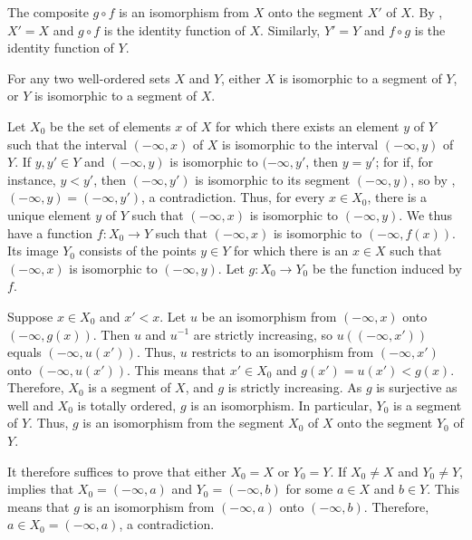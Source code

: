\documentclass{article}
\begin{document}
The composite \(g \circ f\) is an isomorphism from \(X\) onto the
segment \(X'\) of \(X\).  By , \(X' = X\) and
\(g \circ f\) is the identity function of \(X\).  Similarly,
\(Y' = Y\) and \(f \circ g\) is the identity function of \(Y\).

\begin{theorem}
  \label{thm:vy95iuyi}
  For any two well-ordered sets \(X\) and \(Y\), either \(X\) is
  isomorphic to a segment of \(Y\), or \(Y\) is isomorphic to a
  segment of \(X\).
\end{theorem}

Let \(X_0\) be the set of elements \(x\) of \(X\) for which there
exists an element \(y\) of \(Y\) such that the interval
\((-\infty, x)\) of \(X\) is isomorphic to the interval
\((-\infty, y)\) of \(Y\).  If \(y, y' \in Y\) and \((-\infty, y)\) is
isomorphic to \((-\infty, y'\), then \(y = y'\); for if, for instance,
\(y < y'\), then \((-\infty, y')\) is isomorphic to its segment
\((-\infty, y)\), so by ,
\((-\infty, y) = (-\infty, y')\), a contradiction.  Thus, for every
\(x \in X_0\), there is a unique element \(y\) of \(Y\) such that
\((-\infty, x)\) is isomorphic to \((-\infty, y)\).  We thus have a
function \(f : X_0 \to Y\) such that \((-\infty, x)\) is isomorphic to
\((-\infty, f(x))\).  Its image \(Y_0\) consists of the points
\(y \in Y\) for which there is an \(x \in X\) such that
\((-\infty, x)\) is isomorphic to \((-\infty, y)\).  Let
\(g : X_0 \to Y_0\) be the function induced by \(f\).

Suppose \(x \in X_0\) and \(x' < x\).  Let \(u\) be an isomorphism
from \((-\infty, x)\) onto \((-\infty, g(x))\).  Then \(u\) and
\(u^{-1}\) are strictly increasing, so \(u((-\infty, x'))\) equals
\((-\infty, u(x'))\).  Thus, \(u\) restricts to an isomorphism from
\((-\infty, x')\) onto \((-\infty, u(x'))\).  This means that
\(x' \in X_0\) and \(g(x') = u(x') < g(x)\).  Therefore, \(X_0\) is a
segment of \(X\), and \(g\) is strictly increasing.  As \(g\) is
surjective as well and \(X_0\) is totally ordered, \(g\) is an
isomorphism.  In particular, \(Y_0\) is a segment of \(Y\).  Thus,
\(g\) is an isomorphism from the segment \(X_0\) of \(X\) onto the
segment \(Y_0\) of \(Y\).

It therefore suffices to prove that either \(X_0 = X\) or \(Y_0 = Y\).
If \(X_0 \neq X\) and \(Y_0 \neq Y\),  implies that
\(X_0 = (-\infty, a)\) and \(Y_0 = (-\infty, b)\) for some \(a \in X\)
and \(b \in Y\).  This means that \(g\) is an isomorphism from
\((-\infty, a)\) onto \((-\infty, b)\).  Therefore,
\(a \in X_0 = (-\infty, a)\), a contradiction.
\end{document}
